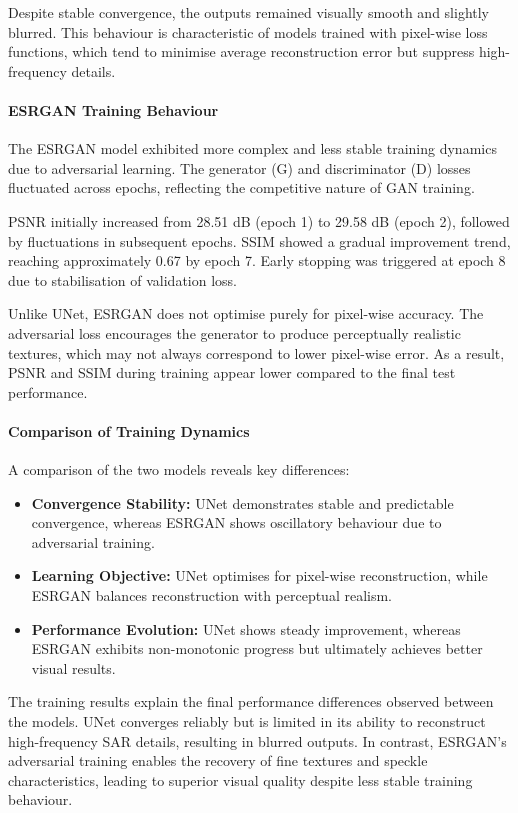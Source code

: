 \documentclass[conference]{IEEEtran}
\begin{document}
Despite stable convergence, the outputs remained visually smooth and slightly blurred. This behaviour is characteristic of models trained with pixel-wise loss functions, which tend to minimise average reconstruction error but suppress high-frequency details.

\paragraph{ESRGAN Training Behaviour}

The ESRGAN model exhibited more complex and less stable training dynamics due to adversarial learning. The generator (G) and discriminator (D) losses fluctuated across epochs, reflecting the competitive nature of GAN training.

PSNR initially increased from 28.51 dB (epoch 1) to 29.58 dB (epoch 2), followed by fluctuations in subsequent epochs. SSIM showed a gradual improvement trend, reaching approximately 0.67 by epoch 7. Early stopping was triggered at epoch 8 due to stabilisation of validation loss.

Unlike UNet, ESRGAN does not optimise purely for pixel-wise accuracy. The adversarial loss encourages the generator to produce perceptually realistic textures, which may not always correspond to lower pixel-wise error. As a result, PSNR and SSIM during training appear lower compared to the final test performance.

\paragraph{Comparison of Training Dynamics}

A comparison of the two models reveals key differences:

\begin{itemize}
    \item \textbf{Convergence Stability:} UNet demonstrates stable and predictable convergence, whereas ESRGAN shows oscillatory behaviour due to adversarial training.
    \item \textbf{Learning Objective:} UNet optimises for pixel-wise reconstruction, while ESRGAN balances reconstruction with perceptual realism.
    \item \textbf{Performance Evolution:} UNet shows steady improvement, whereas ESRGAN exhibits non-monotonic progress but ultimately achieves better visual results.
\end{itemize}

The training results explain the final performance differences observed between the models. UNet converges reliably but is limited in its ability to reconstruct high-frequency SAR details, resulting in blurred outputs. In contrast, ESRGAN’s adversarial training enables the recovery of fine textures and speckle characteristics, leading to superior visual quality despite less stable training behaviour.
\end{document}
